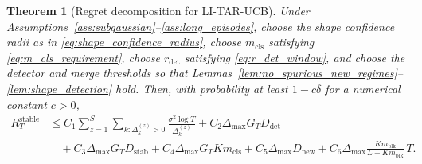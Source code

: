 \documentclass[11pt]{article}
\newtheorem{theorem}{Theorem}
\begin{document}
\begin{theorem}[Regret decomposition for LI-TAR-UCB]
\label{thm:main_regret}
Under Assumptions~\ref{ass:subgaussian}--\ref{ass:long_episodes}, choose the shape confidence radii as in \eqref{eq:shape_confidence_radius}, choose $m_{\mathrm{cls}}$ satisfying \eqref{eq:m_cls_requirement}, choose $r_{\mathrm{det}}$ satisfying \eqref{eq:r_det_window}, and choose the detector and merge thresholds so that Lemmas~\ref{lem:no_spurious_new_regimes}--\ref{lem:shape_detection} hold. Then, with probability at least $1-c\delta$ for a numerical constant $c>0$,
\begin{align}
\label{eq:main_regret_bound}
R_T^{\mathrm{stable}}
&\leq
C_1
\sum_{z=1}^{S}
\sum_{k:\Delta_k^{(z)}>0}
\frac{\sigma^2\log T}{\Delta_k^{(z)}}
+
C_2\Delta_{\max}G_TD_{\mathrm{det}}
\nonumber\\
&\quad+
C_3\Delta_{\max}G_TD_{\mathrm{stab}}
+
C_4\Delta_{\max}G_TK m_{\mathrm{cls}}
+
C_5\Delta_{\max}D_{\mathrm{new}}
+
C_6\Delta_{\max}\frac{Km_{\mathrm{blk}}}{L+Km_{\mathrm{blk}}}\,T.
\end{align}
\end{theorem}
\end{document}
